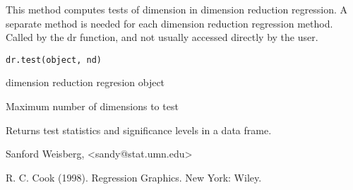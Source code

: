 \begin{Description}\relax
This method computes tests of dimension in dimension reduction regression.
A separate method is needed for each dimension reduction regression method.
Called by the dr function, and not usually accessed directly by the user.\end{Description}
\begin{Usage}
\begin{verbatim}
dr.test(object, nd)
\end{verbatim}
\end{Usage}
\begin{Arguments}
\begin{ldescription}
\item[\code{object}] dimension reduction regresion object 
\item[\code{nd}] Maximum number of dimensions to test 
\end{ldescription}
\end{Arguments}
\begin{Value}
Returns test statistics and significance levels in a data frame.\end{Value}
\begin{Author}\relax
Sanford Weisberg, <sandy@stat.umn.edu>\end{Author}
\begin{References}\relax
R. C. Cook (1998).  Regression Graphics. New York:  Wiley.\end{References}
\begin{SeeAlso}\relax
{}\end{SeeAlso}


